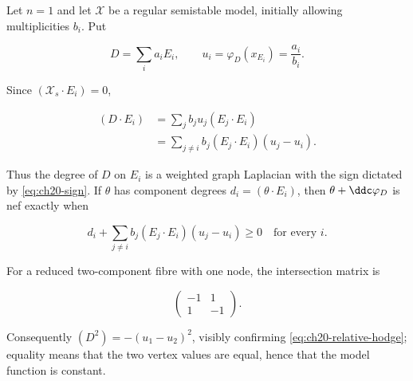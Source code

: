 \begin{example}
\label{ex:ch20-semistable-curve}
Let $n=1$ and let $\mathcal X$ be a regular semistable model, initially
allowing multiplicities $b_i$.  Put

\begin{equation}
\label{eq:ch20-curve-values}
       D=\sum_i a_iE_i,
       \qquad u_i=\varphi_D(x_{E_i})=\frac{a_i}{b_i}.
\end{equation}

Since $(\mathcal X_s\cdot E_i)=0$,

\begin{equation}
\label{eq:ch20-graph-laplacian}
 \begin{aligned}
 (D\cdot E_i)
 &=\sum_j b_ju_j(E_j\cdot E_i)\\
 &=\sum_{j\neq i}b_j(E_j\cdot E_i)(u_j-u_i).
 \end{aligned}
\end{equation}

Thus the degree of $D$ on $E_i$ is a weighted graph Laplacian with the
sign dictated by \eqref{eq:ch20-sign}.  If $\theta$ has component degrees
$d_i=(\theta\cdot E_i)$, then $\theta+\ddc\varphi_D$ is nef exactly
when

\begin{equation}
\label{eq:ch20-curve-nef-test}
 d_i+\sum_{j\neq i}b_j(E_j\cdot E_i)(u_j-u_i)\geq0
 \quad\text{for every }i.
\end{equation}

For a reduced two-component fibre with one node, the intersection matrix is

\begin{equation}
\label{eq:ch20-two-component-matrix}
              \begin{pmatrix}-1&1\\1&-1\end{pmatrix}.
\end{equation}

Consequently
$(D^2)=-(u_1-u_2)^2$, visibly confirming
\eqref{eq:ch20-relative-hodge}; equality means that the two vertex values
are equal, hence that the model function is constant.
\end{example}

